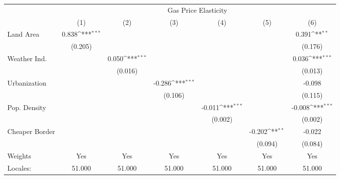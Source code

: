 {
\def\sym#1{\ifmmode^{#1}\else\(^{#1}\)\fi}
\begin{tabular}{l*{6}{c}}
\hline\hline
            &\multicolumn{6}{c}{Gas Price Elasticity}                                                                                           \\
            &\multicolumn{1}{c}{(1)}         &\multicolumn{1}{c}{(2)}         &\multicolumn{1}{c}{(3)}         &\multicolumn{1}{c}{(4)}         &\multicolumn{1}{c}{(5)}         &\multicolumn{1}{c}{(6)}         \\
\hline
Land Area   &       0.838\sym{***}&                     &                     &                     &                     &       0.391\sym{**} \\
            &     (0.205)         &                     &                     &                     &                     &     (0.176)         \\
[1em]
Weather Ind.&                     &       0.050\sym{***}&                     &                     &                     &       0.036\sym{***}\\
            &                     &     (0.016)         &                     &                     &                     &     (0.013)         \\
[1em]
Urbanization&                     &                     &      -0.286\sym{***}&                     &                     &      -0.098         \\
            &                     &                     &     (0.106)         &                     &                     &     (0.115)         \\
[1em]
Pop. Density&                     &                     &                     &      -0.011\sym{***}&                     &      -0.008\sym{***}\\
            &                     &                     &                     &     (0.002)         &                     &     (0.002)         \\
[1em]
Cheaper Border&                     &                     &                     &                     &      -0.202\sym{**} &      -0.022         \\
            &                     &                     &                     &                     &     (0.094)         &     (0.084)         \\
\hline
Weights     &         Yes         &         Yes         &         Yes         &         Yes         &         Yes         &         Yes         \\
Locales:    &      51.000         &      51.000         &      51.000         &      51.000         &      51.000         &      51.000         \\
\hline\hline
\end{tabular}
}
